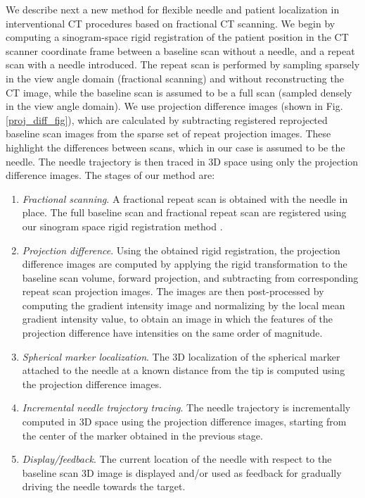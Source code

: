 We describe next a new method for flexible needle and patient localization in interventional CT procedures based on fractional CT scanning. We begin by computing a sinogram-space rigid registration of the patient position in the CT scanner coordinate frame between a baseline scan without a needle, and a repeat scan with a needle introduced. The repeat scan is performed by sampling sparsely in the view angle domain (fractional scanning) and without reconstructing the CT image, while the baseline scan is assumed to be a full scan (sampled densely in the view angle domain). We use projection difference images (shown in Fig. \ref{proj_diff_fig}), which are calculated by subtracting registered reprojected baseline scan images from the sparse set of repeat projection images. These highlight the differences between scans, which in our case is assumed to be the needle. The needle trajectory is then traced in 3D space using only the projection difference images. The stages of our method are:
\begin{enumerate}
\item \textit{Fractional scanning}. A fractional repeat scan is obtained with the needle in place. The full baseline scan and fractional repeat scan are registered using our sinogram space rigid registration method \cite{medan2017sparse}.
\item \textit{Projection difference}. Using the obtained rigid registration, the projection difference images are computed by applying the rigid transformation to the baseline scan volume, forward projection, and subtracting from corresponding repeat scan projection images. The images are then post-processed by computing the gradient intensity image and normalizing by the local mean gradient intensity value, to obtain an image in which the features of the projection difference have intensities on the same order of magnitude.
\item \textit{Spherical marker localization}. The 3D localization of the spherical marker attached to the needle at a known distance from the tip is computed using the projection difference images.
\item \textit{Incremental needle trajectory tracing}. The needle trajectory is incrementally computed in 3D space using the projection difference images, starting from the center of the marker obtained in the previous stage. 
\item \textit{Display/feedback}. The current location of the needle with respect to the baseline scan 3D image is displayed and/or used as feedback for gradually driving the needle towards the target.
\end{enumerate}
